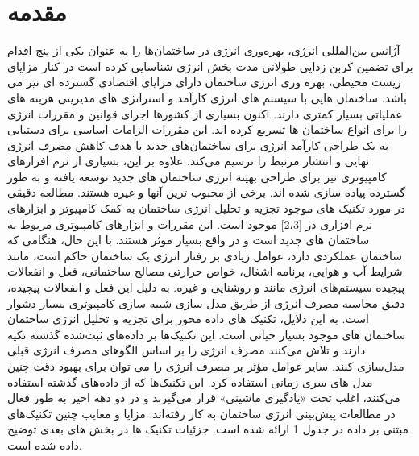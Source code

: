 \chapter{مقدمه}

آژانس بین‌المللی انرژی، بهره‌وری انرژی در ساختمان‌ها را به عنوان یکی از پنج اقدام برای تضمین کربن زدایی طولانی مدت بخش انرژی شناسایی کرده است\cite{DEB2017902}
در کنار مزایای زیست محیطی، بهره وری انرژی ساختمان دارای مزایای اقتصادی گسترده ای نیز می باشد. ساختمان هایی با سیستم های انرژی کارآمد و استراتژی های مدیریتی هزینه های عملیاتی بسیار کمتری دارند. اکنون بسیاری از کشورها اجرای قوانین و مقررات انرژی را برای انواع ساختمان ها تسریع کرده اند. این مقررات الزامات اساسی برای دستیابی به یک طراحی کارآمد انرژی برای ساختمان‌های جدید با هدف کاهش مصرف انرژی نهایی و انتشار  مرتبط را ترسیم می‌کند. علاوه بر این، بسیاری از نرم افزارهای کامپیوتری نیز برای طراحی بهینه انرژی ساختمان های جدید توسعه یافته و به طور گسترده پیاده سازی شده اند. برخی از محبوب ترین آنها  و غیره هستند. مطالعه دقیقی در مورد تکنیک های موجود تجزیه و تحلیل انرژی ساختمان به کمک کامپیوتر و ابزارهای نرم افزاری در [2،3] موجود است. این مقررات و ابزارهای کامپیوتری مربوط به ساختمان های جدید است و در واقع بسیار موثر هستند. با این حال، هنگامی که ساختمان عملکردی دارد، عوامل زیادی بر رفتار انرژی یک ساختمان حاکم است، مانند شرایط آب و هوایی، برنامه اشغال، خواص حرارتی مصالح ساختمانی، فعل و انفعالات پیچیده سیستم‌های انرژی مانند  و روشنایی و غیره. به دلیل این فعل و انفعالات پیچیده، دقیق محاسبه مصرف انرژی از طریق مدل سازی شبیه سازی کامپیوتری بسیار دشوار است. به این دلایل، تکنیک های داده محور برای تجزیه و تحلیل انرژی ساختمان ساختمان های موجود بسیار حیاتی است. این تکنیک‌ها بر داده‌های ثبت‌شده گذشته تکیه دارند و تلاش می‌کنند مصرف انرژی را بر اساس الگوهای مصرف انرژی قبلی مدل‌سازی کنند. سایر عوامل مؤثر بر مصرف انرژی را می توان برای بهبود دقت چنین مدل های سری زمانی استفاده کرد. این تکنیک‌ها که از داده‌های گذشته استفاده می‌کنند، اغلب تحت «یادگیری ماشینی» قرار می‌گیرند و در دو دهه اخیر به طور فعال در مطالعات پیش‌بینی انرژی ساختمان به کار رفته‌اند. مزایا و معایب چنین تکنیک‌های مبتنی بر داده در جدول 1 ارائه شده است. جزئیات تکنیک ها در بخش های بعدی توضیح داده شده است.